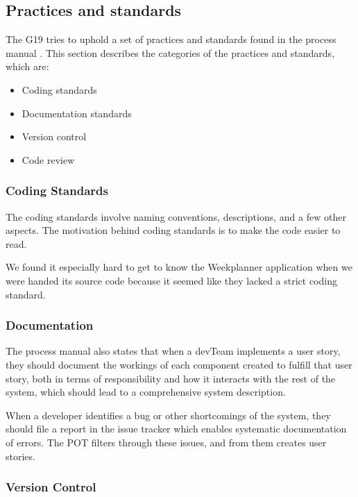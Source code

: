 \subsection{Practices and standards}

The \gls{G19} tries to uphold a set of practices and standards found in the process manual \cite{processManual}. This section describes the categories of the practices and standards, which are:

\begin{itemize}
    \item Coding standards
    \item Documentation standards
    \item Version control
    \item Code review
\end{itemize}

\subsubsection{Coding Standards}

The coding standards involve naming conventions, descriptions, and a few other aspects. The motivation behind coding standards is to make the code easier to read.

We found it especially hard to get to know the Weekplanner application when we were handed its source code because it seemed like they lacked a strict coding standard.

\subsubsection{Documentation}

The process manual also states that when a \gls{devTeam} implements a user story, they should document the workings of each component created to fulfill that user story, both in terms of responsibility and how it interacts with the rest of the system, which should lead to a comprehensive system description.

When a developer identifies a bug or other shortcomings of the system, they should file a report in the issue tracker which enables systematic documentation of errors. The \gls{POT} filters through these issues, and from them creates user stories.

\subsubsection{Version Control}

